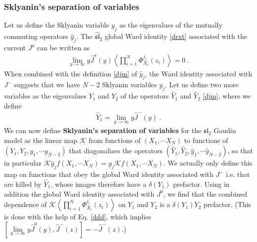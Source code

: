 \documentclass[12pt, a4paper, notitlepage, twoside]{report}
\numberwithin{equation}{section}
\theoremstyle{break}
\begin{document}
\subsubsection{Sklyanin's separation of variables}

Let us define the Sklyanin variable $y_j$ as the eigenvalues of the mutually commuting operators $\hat{y}_j$. 
The $\widehat{\mathfrak{sl}}_2$ global Ward identity \eqref{drxt} associated with the current $J^a$ can be written as 
\begin{align}
 \underset{y\to \infty}{\lim} y \hat{J}^a(y) \left\langle \prod_{i=1}^N \Phi^{j_i}_{X_i}(z_i)\right\rangle = 0\ .
\end{align}
When combined with the definition \eqref{djm} of $\hat{y}_j$, the Ward identity associated with $J^-$ suggests that we have $N-2$ Sklyanin variables $y_j$.
Let us define two more variables as the eigenvalues $Y_1$ and $Y_2$ of the operators $\hat{Y}_1$ and $\hat{Y}_2$ \eqref{djm}, where we define
\begin{align}
 \hat{Y}_1 = \underset{y\to \infty}{\lim} y \hat{J}^-(y)\ .
\end{align}
We can now define  \textbf{\boldmath Sklyanin's separation of variables} for the $\mathfrak{sl}_2$ Gaudin model as the linear 
map $\mathcal{K}$ from functions of $(X_1,\cdots X_N)$ to functions of $(Y_1,Y_2,y_1,\cdots y_{N-2})$ that diagonalizes the operators $(\hat{Y}_1,\hat{Y}_2,\hat{y}_1,\cdots \hat{y}_{N-2})$, so that in particular $\mathcal{K} \hat{y}_j f(X_1,\cdots X_N) = y_j \mathcal{K} f(X_1,\cdots X_N)$.
We actually only define this map on 
functions that obey the global Ward identity associated with $J^-$ i.e.
that are killed by $\hat{Y}_1$, whose images therefore have a $\delta(Y_1)$ prefactor.
Using in addition the global Ward identity associated with $J^0$, we find that the combined dependence of $\mathcal{K}\left\langle \prod_{i=1}^N \Phi^{j_i}_{X_i}(z_i)\right\rangle$ on $Y_1$ and $Y_2$ is a $\delta(Y_1)Y_2$ prefactor.
(This is done with the help of Eq. \eqref{ddd}, which implies $\left[\underset{y\to \infty}{\lim} y \hat{J}^0(y),\hat{J}^-(z)\right]=-\hat{J}^-(z)$.)
\end{document}
